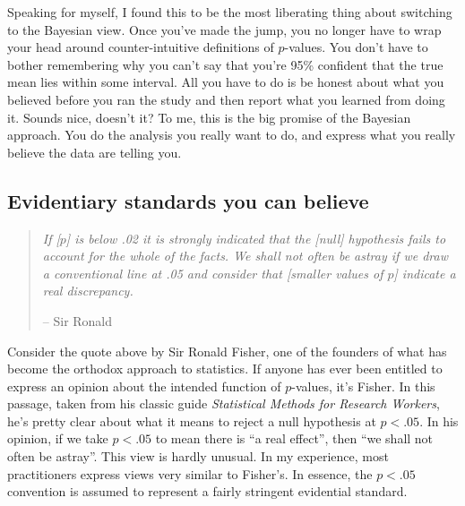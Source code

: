 Speaking for myself, I found this to be the most liberating thing about switching to the Bayesian view. Once you've made the jump, you no longer have to wrap your head around counter-intuitive definitions of $p$-values. You don't have to bother remembering why you can't say that you're 95\% confident that the true mean lies within some interval. All you have to do is be honest about what you believed before you ran the study and then report what you learned from doing it. Sounds nice, doesn't it? To me, this is the big promise of the Bayesian approach. You do the analysis you really want to do, and express what you really believe the data are telling you.


\subsection{Evidentiary standards you can believe}

\begin{quote}
{\it If [$p$] is below .02 it is strongly indicated that the [null] hypothesis fails to account for the whole of the facts. We shall not often be astray if we draw a conventional line at .05 and consider that [smaller values of $p$] indicate a real discrepancy.}

\hspace*{2cm} -- Sir Ronald \textcite{Fisher1925}
\end{quote}

Consider the quote above by Sir Ronald Fisher, one of the founders of what has become the orthodox approach to statistics. If anyone has ever been entitled to express an opinion about the intended function of $p$-values, it's Fisher. In this passage, taken from his classic guide {\it Statistical Methods for Research Workers}, he's pretty clear about what it means to reject a null hypothesis at $p<.05$. In his opinion, if we take $p<.05$ to mean there is ``a real effect'', then ``we shall not often be astray''. This view is hardly unusual. In my experience, most practitioners express views very similar to Fisher's. In essence, the $p<.05$ convention is assumed to represent a fairly stringent evidential standard.

